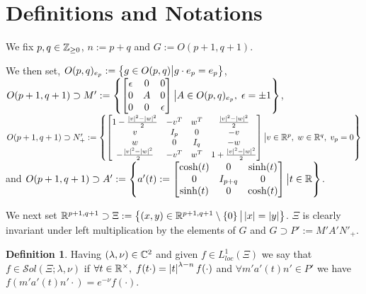 \documentclass[10pt]{article} %
\title{}
\author{Alex Leontiev}
\newcommand{\D}{\mathcal{D}}
\theoremstyle{definition}
\newtheorem{mydef}{Definition}[section]
\theoremstyle{remark}
\begin{document}
\newcommand{\sone}{$\mybra{\D'(G\times_P\C_{\lambda-n})\otimes\C_\nu}^{\Delta(P')}$}
\newcommand{\Upp}{\mysetn{(x,y)\in\R^{p,q}}{x\neq0,\;y\neq0}}
\newcommand{\Stab}{O(p,q)_{e_p}}
\newcommand{\sol}[1][\R^{p,q}]{\mathcal{S}ol( #1;\lambda,\nu)}
\maketitle
\section{Definitions and Notations}
We fix $p,q\in\mathbb{Z}_{\geq0}$, $n:=p+q$ and $G:=O(p+1,q+1)$.

We then set, $\Stab:=\mysetn{ g\in O(p,q) }{ g\cdot e_p=e_p }$,
$O(p+1,q+1)\supset M':=\mysetn{ \begin{bmatrix}\epsilon&0&0\\0&A&0\\0&0&\epsilon\end{bmatrix}}{A\in \Stab,\;\epsilon=\pm1}$,\\
$O(p+1,q+1)\supset N_+':=\left\{
\begin{bmatrix}
	1-\frac{ \left| v \right|^2-\left| w \right|^2 }{2}&-v^T&w^T&\frac{ \left| v \right|^2-\left| w \right|^2 }{2}\\
	v&I_{ p }&0&-v\\w&0&I_q&-w\\-\frac{ \left| v \right|^2-\left| w \right|^2 }{2}&-v^T&w^T&1+\frac{ \left| v \right|^2-\left| w \right|^2 }{2}\\
\end{bmatrix}\big| v\in\mathbb{R}^p,\;w\in\mathbb{R}^q,\;v_p=0\right\}$ and
$O(p+1,q+1)\supset A':=\left\{a'(t):= 
	\begin{bmatrix}
		\cosh(t)&0&\sinh(t)\\0&I_{ p+q }&0\\\sinh(t)&0&\cosh(t)
	\end{bmatrix}
\big| t\in\mathbb{R}\right\}$.

We next set $\mathbb{R}^{ p+1,q+1 }\supset\Xi:=\left\{ (x,y)\in\mathbb{R}^{ p+1,q+1 }\setminus \left\{ 0 \right\}\big| \left|x\right|=\left|y\right|\right\}$.
$\Xi$ is clearly invariant under left multiplication by the elements of $G$ and $G\supset P':=M'A'N'_+$.
\begin{mydef}
	Having $(\lambda,\nu)\in\mathbb{C}^2$ and given $f\in L^1_{loc}(\Xi)$ we say that $f\in\sol[\Xi]$
	if $\forall t\in\mathbb{R}^\times,\;f(t\cdot)=\left|t\right|^{\lambda-n}f(\cdot)$ and 
	$\forall m'a'(t)n'\in P'$
	we have $f(m'a'(t)n'\cdot)=e^{ -\nu }f(\cdot)$.
\end{mydef}
\end{document}
